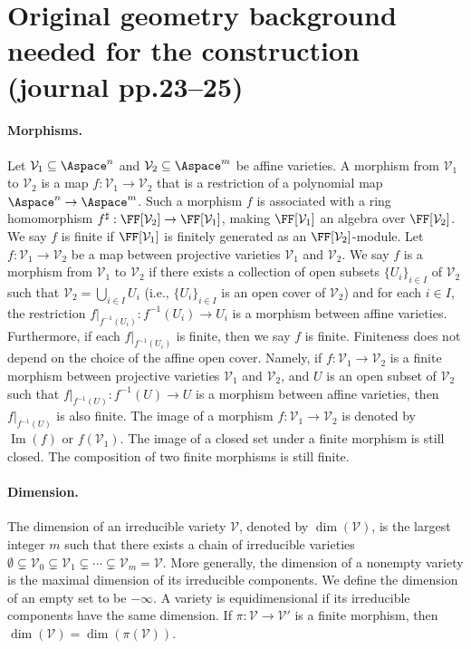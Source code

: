 \section*{Original geometry background needed for the construction (journal pp.23--25)}
\paragraph{Morphisms.}
Let $\mathcal V_1\subseteq\Aspace^n$ and $\mathcal V_2\subseteq\Aspace^m$ be affine varieties. A morphism from $\mathcal V_1$ to $\mathcal V_2$ is a map $f:\mathcal V_1\to\mathcal V_2$ that is a restriction of a polynomial map $\Aspace^n\to\Aspace^m$. Such a morphism $f$ is associated with a ring homomorphism $f^\sharp:\FF[\mathcal V_2]\to\FF[\mathcal V_1]$, making $\FF[\mathcal V_1]$ an algebra over $\FF[\mathcal V_2]$. We say $f$ is finite if $\FF[\mathcal V_1]$ is finitely generated as an $\FF[\mathcal V_2]$-module.
Let $f:\mathcal V_1\to\mathcal V_2$ be a map between projective varieties $\mathcal V_1$ and $\mathcal V_2$. We say $f$ is a morphism from $\mathcal V_1$ to $\mathcal V_2$ if there exists a collection of open subsets $\{U_i\}_{i\in I}$ of $\mathcal V_2$ such that $\mathcal V_2=\bigcup_{i\in I}U_i$ (i.e., $\{U_i\}_{i\in I}$ is an open cover of $\mathcal V_2$) and for each $i\in I$, the restriction $f|_{f^{-1}(U_i)}:f^{-1}(U_i)\to U_i$ is a morphism between affine varieties. Furthermore, if each $f|_{f^{-1}(U_i)}$ is finite, then we say $f$ is finite. Finiteness does not depend on the choice of the affine open cover. Namely, if $f:\mathcal V_1\to\mathcal V_2$ is a finite morphism between projective varieties $\mathcal V_1$ and $\mathcal V_2$, and $U$ is an open subset of $\mathcal V_2$ such that $f|_{f^{-1}(U)}:f^{-1}(U)\to U$ is a morphism between affine varieties, then $f|_{f^{-1}(U)}$ is also finite.
The image of a morphism $f:\mathcal V_1\to\mathcal V_2$ is denoted by $\operatorname{Im}(f)$ or $f(\mathcal V_1)$. The image of a closed set under a finite morphism is still closed. The composition of two finite morphisms is still finite.
\paragraph{Dimension.}
The dimension of an irreducible variety $\mathcal V$, denoted by $\dim(\mathcal V)$, is the largest integer $m$ such that there exists a chain of irreducible varieties $\emptyset\subsetneq\mathcal V_0\subsetneq\mathcal V_1\subsetneq\cdots\subsetneq\mathcal V_m=\mathcal V$. More generally, the dimension of a nonempty variety is the maximal dimension of its irreducible components. We define the dimension of an empty set to be $-\infty$. A variety is equidimensional if its irreducible components have the same dimension.
If $\pi:\mathcal V\to\mathcal V'$ is a finite morphism, then $\dim(\mathcal V)=\dim(\pi(\mathcal V))$.
